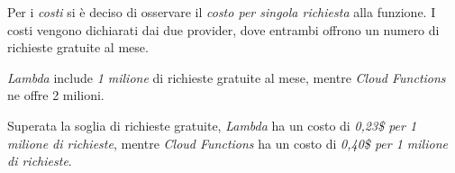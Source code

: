 Per i \textit{costi} si è deciso di osservare il \textit{costo per singola richiesta} alla funzione. I costi vengono dichiarati dai due provider, dove entrambi offrono un numero di richieste gratuite al mese.

\textit{Lambda} include \textit{1 milione} di richieste gratuite al mese, mentre \textit{Cloud Functions} ne offre 2 milioni.

Superata la soglia di richieste gratuite, \textit{Lambda} ha un costo di \textit{0,23\$ per 1 milione di richieste}, mentre \textit{Cloud Functions} ha un costo di \textit{0,40\$ per 1 milione di richieste}.